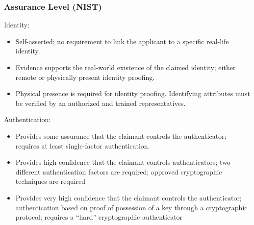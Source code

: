 \documentclass[a4paper, 10pt, titlepage]{article}
\begin{document}
\subsubsection{Assurance Level (NIST)}
Identity:
\begin{itemize}
\item Self-asserted; no requirement to link the applicant to a specific real-life identity.
\item Evidence supports the real-world existence of the claimed identity; either remote or physically present identity proofing.
\item Physical presence is required for identity proofing. Identifying attributes must be verified by an authorized and trained representatives.
\end{itemize}
Authentication:
\begin{itemize}
\item Provides some assurance that the claimant controls the authenticator; requires at least single-factor authentication.
\item Provides high confidence that the claimant controls authenticators; two different authentication factors are required;
approved cryptographic techniques are required
\item Provides very high confidence that the claimant controls the authenticator; authentication based on proof of possession of a key through a cryptographic protocol; requires a “hard” cryptographic authenticator
\end{itemize}

\newpage
\end{document}
